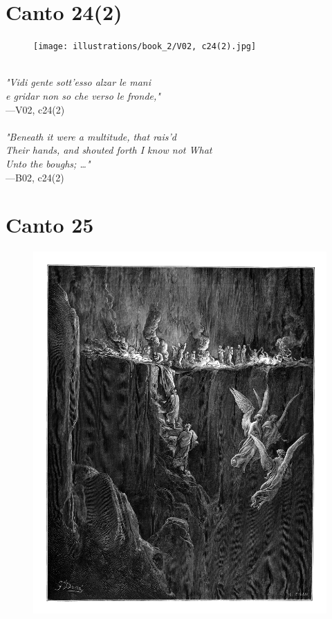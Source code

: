 \documentclass[../Dore_vision.tex]{subfiles}
\begin{document}
\newpage

\section{Canto 24(2)}

\begin{figure}[ht]
\centering
\texttt{[image: illustrations/book\_2/V02, c24(2).jpg]}
\end{figure}

\begin{center}
\begin{minipage}{0.8\linewidth}
\textit{\\
"Vidi gente sott’esso alzar le mani\\e gridar non so che verso le fronde,"} \\
—V02, c24(2) \\~\\
\textit{"Beneath it were a multitude, that rais'd\\Their hands, and shouted forth I know not What\\Unto the boughs; …"} \\
—B02, c24(2)
\end{minipage}
\end{center}

\newpage

\section{Canto 25}

\begin{figure}[ht]
\centering
\includegraphics[height=\figsize]{illustrations/book_2/V02, c25.jpg}
\end{figure}
\end{document}
